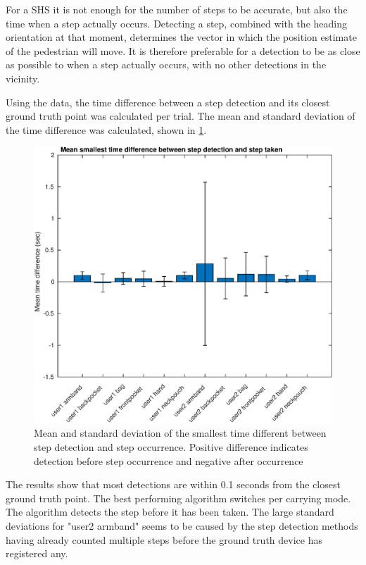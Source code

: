 For a \ac{SHS} it is not enough for the number of steps to be accurate, but also the time when a step actually occurs. Detecting a step, combined with the heading orientation at that moment, determines the vector in which the position estimate of the pedestrian will move. It is therefore preferable for a detection to be as close as possible to when a step actually occurs, with no other detections in the vicinity. \par
Using the \citet{Salvi2018} data, the time difference between a step detection and its closest ground truth point was calculated per trial. The mean and standard deviation of the time difference was calculated, shown in \cref{fig:202011130914smallest_diff_to_gt_1}. 

\begin{figure}[H]
	\centering
	\includegraphics[width=0.7\linewidth]{images/20201127_1607_Mean_smallest_time_difference_between_step_detection_and_step_taken}
	\caption{Mean and standard deviation of the smallest time different between step detection and step occurrence. Positive difference indicates detection before step occurrence and negative after occurrence}
	\label{fig:202011130914smallest_diff_to_gt_1}
\end{figure}

The results show that most detections are within 0.1 seconds from the closest ground truth point. The best performing algorithm switches per carrying mode. The \citet{Salvi2018} algorithm detects the step before it has been taken. The large standard deviations for "user2 armband" seems to be caused by the step detection methods having already counted multiple steps before the ground truth device has registered any.

